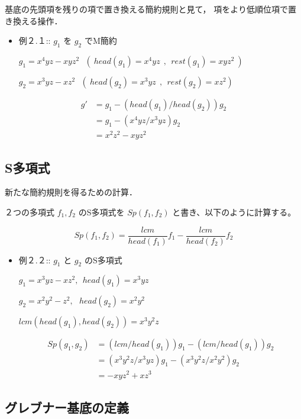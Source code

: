 \documentclass[a4j]{jarticle}
\begin{document}
基底の先頭項を残りの項で置き換える簡約規則と見て，
項をより低順位項で置き換える操作．

\begin{itemize}
\item 例２.１:: \(g_1\) を \(g_2\) でM簡約

\(g_1 = x^4yz - xyz^2~~~(~head(g_1) = x^4yz~~,~~rest(g_1) = xyz^2~)~\)

\(g_2 = x^3yz - xz^2~~~(~head(g_2) = x^3yz~~,~~rest(g_2) = xz^2)~\)
\end{itemize}

$$\begin{array}{ll}
g' & = g_1 - ( head(g_1) / head(g_2) ) g_2 \\
   & = g_1 - ( x^4yz / x^3yz ) g_2 \\
   & = x^2z^2 - xyz^2
\end{array}$$

\subsection{S多項式}
\label{sec:orgd737c89}

新たな簡約規則を得るための計算．

２つの多項式 \(f_1,f_2\) のS多項式を \(Sp(f_1,f_2)\) と書き、以下のように計算する。

$$Sp(f_1,f_2)= \frac{lcm}{head(f_1)}f_1 - \frac{lcm}{head(f_2)}f_2$$

\begin{itemize}
\item 例２.２:: \(g_1\) と \(g_2\) のS多項式

\(g_1 = x^3yz - xz^2,\ \   head(g_1) = x^3yz\)

\(g_2 = x^2y^2 - z^2,\ \  \  head(g_2) = x^2y^2\)

\(lcm(head(g_1), head(g_2)) = x^3y^2z\)

$$\begin{array}{ll} 
  Sp(g_1,g_2) &= ( lcm / head(g_1) ) g_1 - ( lcm / head(g_1)) g_2 \\
            &= ( x^3y^2z / x^3yz ) g_1 - ( x^3y^2z / x^2y^2 ) g_2 \\
            &= -xyz^2 + xz^3
  \end{array}$$
\end{itemize}

\subsection{グレブナー基底の定義}
\label{sec:orgb27a5db}
\end{document}

